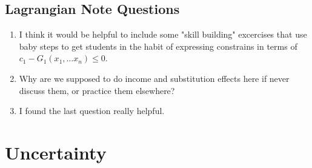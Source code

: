 \documentclass[12pt, fleqn]{article}
\begin{document}
\subsection{Lagrangian Note Questions}
\begin{enumerate}
	\item I think it would be helpful to include some "skill building" excercises that use baby steps to get students in the habit of expressing constrains in terms of $c_{1}-G_{1}\left(  x_{1},\dots x_{n}\right) \leq 0$.  
	\item Why are we supposed to do income and substitution effects here if never discuss them, or practice them elsewhere?  
	\item I found the last question really helpful.  
\end{enumerate}

\section{Uncertainty}
\end{document}
